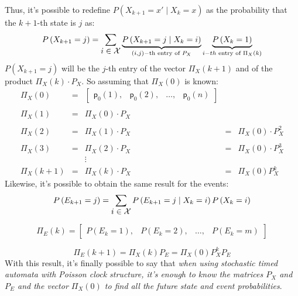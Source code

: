 \documentclass[12pt,a4paper]{article}
\newcommand*{\transp}{\mathsf{p}}
\begin{document}
\noindent
Thus, it's possible to redefine $P(X_{k+1} = x' \mid X_k = x)$ as the probability that the $k+1$-th state is $j$ as:
$$
P\left(X_{k+1}=j\right)=\sum_{\mathlarger{i\in \mathcal{X}}}
{
\underbrace{P\left(X_{k+1}=j  \mid  X_k=i\right)}_{(i,j)-\text{th}\text{ entry of }P_X}
\underbrace{P\left(X_k=1\right)}_{i-th\text{ entry of }\Pi_X(k)}
}
$$ 
$P(X_{k+1} = j)$ will be the $j$-th entry of the vector $\Pi_X(k+1)$ and of the product $\Pi_X(k) \cdot P_X$. 
So assuming that $\Pi_X(0)$ is known:
$$
\begin{matrix} 
\Pi_X(0)&=&\left[ %
\begin{matrix} %
\transp_0(1),& %
\transp_0(2),& %
\dots,& %
\transp_0(n)%
\end{matrix} %
\right]\\\\%
\Pi_X(1)&=&\Pi_X(0) \cdot P_X\\\\%
\Pi_X(2)&=&\Pi_X(1) \cdot P_X&=&\Pi_X(0) \cdot P_X^2\\\\%
\Pi_X(3)&=&\Pi_X(2) \cdot P_X&=&\Pi_X(0) \cdot P_X^3\\
&&\vdots\\
\Pi_X(k+1)&=&\Pi_X(k) \cdot P_X&=&\Pi_X(0)P_X^k
\end{matrix}
$$
Likewise, it's possible to obtain the same result for the events: 
$$
P\left(E_{k+1}=j\right)=\sum_{\mathlarger{i\in\mathcal{X}}}{P\left(E_{k+1}=j \mid X_k=i\right)P\left(X_k=i\right)}
$$

$$
\Pi_E(k)=
\left[
\begin{matrix}
P\left(E_k=1\right),&
P\left(E_k=2\right),&
\dots,&
P\left(E_k=m\right)
\end{matrix}
\right]
$$

$$
\Pi_E(k+1)=\Pi_X(k)P_E=\Pi_X(0)P_X^kP_E
$$
With this result, it's finally possible to say that \emph{when using stochastic timed automata with Poisson clock structure, it's enough to know the matrices $P_X$ and $P_E$ and the vector $\Pi_X(0)$ to find all the future state and event probabilities}. 
\end{document}
